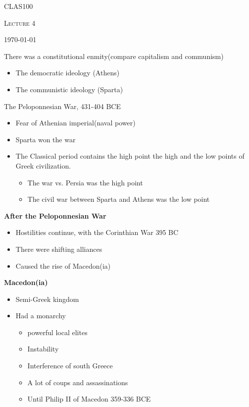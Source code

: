 \documentclass[12pt,a4paper]{report}
\begin{document}
	\centering
	{\scshape\LARGE CLAS100 \par}
	{\scshape\Large Lecture 4\par}
	{\large \today\par}
	\vspace{1.5cm}
	There was a constitutional enmity(compare capitalism and communism)
	\begin{itemize}
	\item The democratic ideology (Athens)
	\item The communistic ideology (Sparta)
	\end{itemize}
	The Peloponnesian War, 431-404 BCE
	\begin{itemize}
	\item Fear of Athenian imperial(naval power)
	\item Sparta won the war
	
	\item The Classical period contains the high point the high and the low points of Greek civilization.
	\begin{itemize}
	\item The war vs. Persia was the high point
	\item The civil war between Sparta and Athens was the low point
	\end{itemize}
	\end{itemize}
	\textbf{After the Peloponnesian War}
	\begin{itemize}
	\item Hostilities continue, with the Corinthian War 395 BC
	\item There were shifting alliances
	\item Caused the rise of Macedon(ia)
	\end{itemize}
	\textbf{Macedon(ia)}
	\begin{itemize}
	\item Semi-Greek kingdom
	\item Had a monarchy
	\begin{itemize}
	\item powerful local elites
	\item Instability
	\item Interference of south Greece
	\item A lot of coups and assassinations
	\item Until Philip II of Macedon 359-336 BCE
	\end{itemize}
	\end{itemize}
\end{document}
